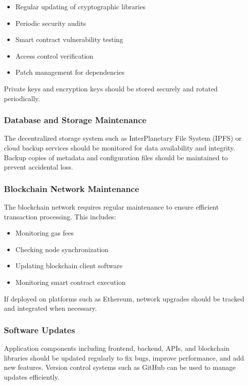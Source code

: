 \documentclass[12pt]{article}
\begin{document}
\begin{itemize}
    \item Regular updating of cryptographic libraries
    \item Periodic security audits
    \item Smart contract vulnerability testing
    \item Access control verification
    \item Patch management for dependencies
\end{itemize}

Private keys and encryption keys should be stored securely and rotated periodically.

\subsubsection{Database and Storage Maintenance}
The decentralized storage system such as InterPlanetary File System (IPFS) or cloud backup services should be monitored for data availability and integrity. Backup copies of metadata and configuration files should be maintained to prevent accidental loss.

\subsubsection{Blockchain Network Maintenance}
The blockchain network requires regular maintenance to ensure efficient transaction processing. This includes:

\begin{itemize}
    \item Monitoring gas fees
    \item Checking node synchronization
    \item Updating blockchain client software
    \item Monitoring smart contract execution
\end{itemize}

If deployed on platforms such as Ethereum, network upgrades should be tracked and integrated when necessary.

\subsubsection{Software Updates}
Application components including frontend, backend, APIs, and blockchain libraries should be updated regularly to fix bugs, improve performance, and add new features. Version control systems such as GitHub can be used to manage updates efficiently.
\end{document}
